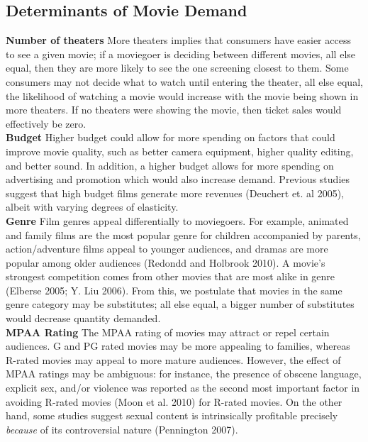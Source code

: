\documentclass[11pt]{article} %
\begin{document}
\subsection{Determinants of Movie Demand} 
\setlength\parindent{0pt}

\begin{adjustwidth}{1cm}{}

\textbf{Number of theaters} \newline
More theaters implies that consumers have easier access to see a given movie; if a moviegoer is deciding between different movies, all else equal, then they are more likely to see the one screening closest to them. Some consumers may not decide what to watch until entering the theater, all else equal, the likelihood of watching a movie would increase with the movie being shown in more theaters. If no theaters were showing the movie, then ticket sales would effectively be zero. \\


\textbf{Budget}\newline
Higher budget could allow for more spending on factors that could improve movie quality, such as better camera equipment, higher quality editing, and better sound. In addition, a higher budget allows for more spending on advertising and promotion which would also increase demand. Previous studies suggest that high budget films generate more revenues (Deuchert et. al 2005), albeit with varying degrees of elasticity.  
\\

\textbf{Genre}\newline
 Film genres appeal differentially to moviegoers. For example, animated and family films are the most popular genre for children accompanied by parents, action/adventure films appeal to younger audiences, and dramas are more popular among older audiences (Redondd and Holbrook 2010). A movie’s strongest competition comes from other movies that are most alike in genre (Elberse 2005; Y. Liu 2006). From this, we postulate that movies in the same genre category may be substitutes; all else equal, a bigger number of substitutes would decrease quantity demanded. 
 \\

\textbf{MPAA Rating}\newline
The MPAA rating of movies may attract or repel certain audiences. G and PG rated movies may be more appealing to families, whereas R-rated movies may appeal to more mature audiences. However, the effect of MPAA ratings may be ambiguous: for instance, the presence of obscene language, explicit sex, and/or violence was reported as the second most important factor in avoiding R-rated movies (Moon et al. 2010) for R-rated movies. On the other hand, some studies suggest sexual content is intrinsically profitable precisely \textit{because} of its controversial nature (Pennington 2007). \\


\end{adjustwidth}
\end{document}
